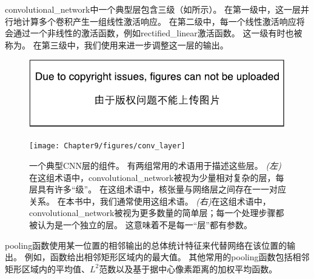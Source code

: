 \gls{convolutional_network}中一个典型层包含三级（如所示）。
在第一级中，这一层并行地计算多个卷积产生一组线性激活响应。
在第二级中，每一个线性激活响应将会通过一个非线性的激活函数，例如\gls{rectified_linear}激活函数。
这一级有时也被称为。
在第三级中，我们使用来进一步调整这一层的输出。
\begin{figure}[!htb]
\ifOpenSource
\centerline{\includegraphics{figure.pdf}}
\else
\centerline{\texttt{[image: Chapter9/figures/conv\_layer]}}
\fi
\caption{一个典型\gls{CNN}层的组件。
有两组常用的术语用于描述这些层。
\emph{(左)}在这组术语中，\gls{convolutional_network}被视为少量相对复杂的层，每层具有许多``级''。
在这组术语中，核张量与网络层之间存在一一对应关系。
在本书中，我们通常使用这组术语。
\emph{(右)}在这组术语中，\gls{convolutional_network}被视为更多数量的简单层；每一个处理步骤都被认为是一个独立的层。
这意味着不是每一``层''都有参数。}
\label{fig:chap9_conv_layer}
\end{figure}

\gls{pooling}函数使用某一位置的相邻输出的总体统计特征来代替网络在该位置的输出。
例如，函数\citep{zhou1988computation}给出相邻矩形区域内的最大值。
其他常用的\gls{pooling}函数包括相邻矩形区域内的平均值、$L^2$范数以及基于据中心像素距离的加权平均函数。

 
